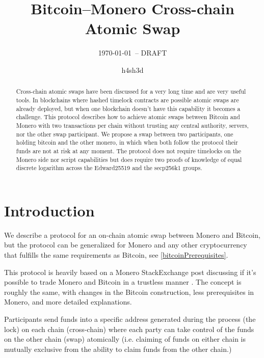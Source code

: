 \documentclass{llncs}
\begin{document}
\title{Bitcoin--Monero Cross-chain Atomic Swap}
\author{h4sh3d}

\subtitle{{\normalsize\today{\small\ -- DRAFT}}}

\maketitle

\begin{abstract}
    Cross-chain atomic swaps have been discussed for a very long time and are very useful tools. In blockchains where hashed timelock contracts are possible atomic swaps are already deployed, but when one blockchain doesn't have this capability it becomes a challenge. This protocol describes how to achieve atomic swaps between Bitcoin and Monero with two transactions per chain without trusting any central authority, servers, nor the other swap participant.
    We propose a swap between two participants, one holding bitcoin and the other monero, in which when both follow the protocol their funds are not at risk at any moment. The protocol does not require timelocks on the Monero side nor script capabilities but does require two proofs of knowledge of equal discrete logarithm across the Edward25519 and the secp256k1 groups.
\end{abstract}

\section{Introduction}
We describe a protocol for an on-chain atomic swap between Monero and Bitcoin, but the protocol can be generalized for Monero and any other cryptocurrency that fulfills the same requirements as Bitcoin, see \ref{bitcoinPrerequisites}.

This protocol is heavily based on a Monero StackExchange post discussing if it's possible to trade Monero and Bitcoin in a trustless manner \cite{MoneroStackexchangeSwap}. The concept is roughly the same, with changes in the Bitcoin construction, less prerequisites in Monero, and more detailed explanations.

Participants send funds into a specific address generated during the process (the lock) on each chain (cross-chain) where each party can take control of the funds on the other chain (swap) atomically (i.e. claiming of funds on either chain is mutually exclusive from the ability to claim funds from the other chain.)
\end{document}

